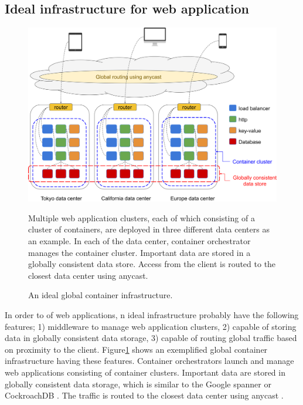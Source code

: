 \subsection{Ideal infrastructure for  web application}

\begin{figure}[h]
\begin{center}
\includegraphics[width=0.9\columnwidth]{Figs/global_container_infrastructure}
\end{center}
\caption{
An ideal global container infrastructure.
}
\centering\parbox[c]{0.9\columnwidth}{
Multiple web application clusters, each of which consisting of a cluster of containers, are deployed in three different data centers as an example.
In each of the data center, container orchestrator manages the container cluster.
Important data are stored in a globally consistent data store.
Access from the client is routed to the closest data center using anycast.
}
\label{fig:global_container_infrastructure}
\end{figure}


In order to  of web applications, 
n ideal infrastructure probably have the following features;
1)  middleware to manage web application clusters,
2) capable of storing data in globally consistent data storage,
3) capable of routing global traffic based on proximity to the client.
%
Figure\ref{fig:global_container_infrastructure} shows an exemplified global container infrastructure having these features.
Container orchestrators launch and manage web applications consisting of container clusters.
Important data are stored in globally consistent data storage, which is similar to the Google spanner \cite{Corbett:2013:SGG:2518037.2491245,Cooper:2013:SGG:2485732.2485756} or CockroachDB \cite{pavlo2016s}.
The traffic is routed to the closest data center using anycast \cite{rfc1546}.

